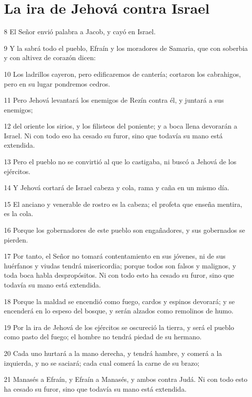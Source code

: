 \section*{La ira de Jehová contra Israel}

\par 8 El Señor envió palabra a Jacob, y cayó en Israel.
\par 9 Y la sabrá todo el pueblo, Efraín y los moradores de Samaria, que con soberbia y con altivez de corazón dicen:
\par 10 Los ladrillos cayeron, pero edificaremos de cantería; cortaron los cabrahigos, pero en su lugar pondremos cedros.
\par 11 Pero Jehová levantará los enemigos de Rezín contra él, y juntará a sus enemigos;
\par 12 del oriente los sirios, y los filisteos del poniente; y a boca llena devorarán a Israel. Ni con todo eso ha cesado su furor, sino que todavía su mano está extendida.
\par 13 Pero el pueblo no se convirtió al que lo castigaba, ni buscó a Jehová de los ejércitos.
\par 14 Y Jehová cortará de Israel cabeza y cola, rama y caña en un mismo día.
\par 15 El anciano y venerable de rostro es la cabeza; el profeta que enseña mentira, es la cola.
\par 16 Porque los gobernadores de este pueblo son engañadores, y sus gobernados se pierden.
\par 17 Por tanto, el Señor no tomará contentamiento en sus jóvenes, ni de sus huérfanos y viudas tendrá misericordia; porque todos son falsos y malignos, y toda boca habla despropósitos. Ni con todo esto ha cesado su furor, sino que todavía su mano está extendida.
\par 18 Porque la maldad se encendió como fuego, cardos y espinos devorará; y se encenderá en lo espeso del bosque, y serán alzados como remolinos de humo.
\par 19 Por la ira de Jehová de los ejércitos se oscureció la tierra, y será el pueblo como pasto del fuego; el hombre no tendrá piedad de su hermano.
\par 20 Cada uno hurtará a la mano derecha, y tendrá hambre, y comerá a la izquierda, y no se saciará; cada cual comerá la carne de su brazo;
\par 21 Manasés a Efraín, y Efraín a Manasés, y ambos contra Judá. Ni con todo esto ha cesado su furor, sino que todavía su mano está extendida.


